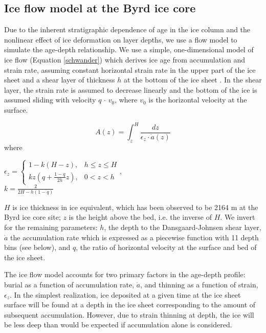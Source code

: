 \subsection{Ice flow model at the Byrd ice core}

Due to the inherent stratigraphic dependence of age in the ice column and the nonlinear effect of ice deformation on layer depths, we use a flow model to simulate the age-depth relationship. We use a simple, one-dimensional model of ice flow (Equation \ref{schwander}) which derives ice age from accumulation and strain rate, assuming constant horizontal strain rate in the upper part of the ice sheet and a shear layer of thickness $h$ at the bottom of the ice sheet \citep{schwander2001}. In the shear layer, the strain rate is assumed to decrease linearly and the bottom of the ice is assumed sliding with velocity $q$ $\cdot$ $v_0$, where $v_0$ is the horizontal velocity at the surface.

\begin{equation}\label{schwander}
A(z) = \int_{z}^{H} \frac{dz}{\epsilon_z \cdot \dot{a}(z)}
\end{equation}
where
\begin{center}
$    \epsilon_z=
    \begin{cases}
                 1-k(H-z), & h \leq z \leq H \\
                  kz(q+\frac{1-q}{2h}z), & 0 < z < h
    \end{cases}, 
$
\\
$
k = \frac{2}{2H - h(1-q)}
$
\end{center}
$H$ is ice thickness in ice equivalent, which has been observed to be 2164 m at the Byrd ice core site;  $z$ is the height above the bed, i.e. the inverse of $H$. We invert for the remaining parameters: $h$, the depth to the Dansgaard-Johnsen shear layer, $\dot{a}$ the accumulation rate which is expressed as a piecewise function with 11 depth bins (see below), and $q$, the ratio of horizontal velocity at the surface and bed of the ice sheet.

The ice flow model accounts for two primary factors in the age-depth profile: burial as a function of accumulation rate, $\dot{a}$, and thinning as a function of strain, $\epsilon_z$. In the simplest realization, ice deposited at a given time at the ice sheet surface will be found at a depth in the ice sheet corresponding to the amount of subsequent accumulation. However, due to strain thinning at depth, the ice will be less deep than would be expected if accumulation alone is considered. 

